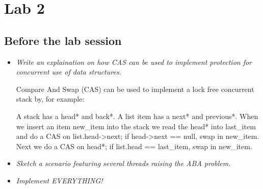 \documentclass[a4paper,12pt]{article}
\begin{document}
\section{Lab 2}
\subsection{Before the lab session}

\begin{itemize}
\item \textit{Write an explaination on how CAS can be used to implement protection for concurrent use of data structures.}

  Compare And Swap (CAS) can be used to implement a lock free concurrent stack by, for example:

  A stack has a head* and back*. A list item has a next* and previous*. When we insert an item new_item into the stack we read the head* into last_item and do a CAS on list.head->next; if head->next == null, swap in new_item. Next we do a CAS on head*; if list.head == last_item, swap in new_item.

\item \textit{Sketch a scenario featuring several threads raising the ABA problem.}


\item \textit{Implement EVERYTHING!}

\end{itemize}
\end{document}
